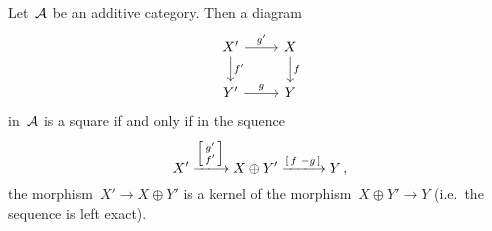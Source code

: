 \section{}

\begin{proposition}
  \label{characterization of pullbacks}
  Let~$\mathcal{A}$ be an additive category.
  Then a diagram
  \[
    \begin{tikzcd}
        X'
        \arrow{r}[above]{g'}
        \arrow{d}[right]{f'}
      & X
        \arrow{d}[right]{f}
      \\
        Y'
        \arrow{r}[above]{g}
      & Y
    \end{tikzcd}
  \]
  in~$\mathcal{A}$ is a {\pb} square if and only if in the squence
  \begin{equation}
    \label{left exact sequence}
      X'
    \xlongto{ \begin{bsmallmatrix} g' \\ f' \end{bsmallmatrix} }
      X \oplus Y'
    \xlongto{ \begin{bsmallmatrix} f & -g \end{bsmallmatrix} }
      Y \,,
  \end{equation}
  the morphism~$X' \to X \oplus Y'$ is a kernel of the morphism~$X \oplus Y' \to Y$ (i.e.\ the sequence is left exact).
\end{proposition} 

